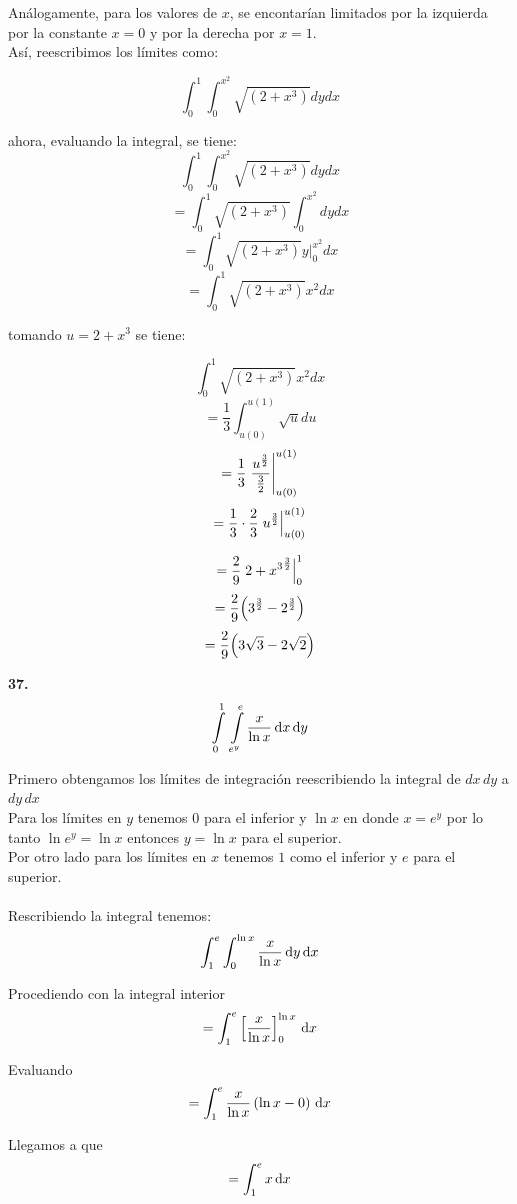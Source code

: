 \documentclass[11pt]{report}
\begin{document}
Análogamente, para los valores de $x$, se encontarían limitados por la izquierda
por la constante $x = 0$ y por la derecha por $x = 1$. \\

Así, reescribimos los límites como:

	$$ \int_{0}^{1}\int_{0}^{x^2} \sqrt{(2 + x^3)} dy dx  $$

ahora, evaluando la integral, se tiene:
	$$   \int_{0}^{1}\int_{0}^{x^2} \sqrt{(2 + x^3)} dy dx  $$
	$$ = \int_{0}^{1}\sqrt{(2 + x^3)} \int_{0}^{x^2} dy dx  $$
	$$ = \int_{0}^{1}\sqrt{(2 + x^3)} y \Big|_{0}^{x^2} dx  $$
	$$ = \int_{0}^{1}\sqrt{(2 + x^3)} x^2  dx  $$

tomando $u = 2 + x^3$ se tiene:

	$$   \int_{0}^{1}\sqrt{(2 + x^3)} x^2  dx  $$
	$$ = \frac{1}{3} \int_{u(0)}^{u(1)}\sqrt{u} du  $$
	$$ = \frac{1}{3} \left.\frac{u^{\frac{3}{2}}}{\frac{3}{2}}\right\rvert_{u(0)}^{u(1)}  $$
	$$ = \frac{1}{3} \cdot \frac{2}{3} \left.u^{\frac{3}{2}}\right\rvert_{u(0)}^{u(1)}  $$

	$$ = \frac{2}{9} \left. {2 + x^3}^{\frac{3}{2}} \right\rvert_{0}^{1}  $$
	$$ = \frac{2}{9} \Big( {3}^{\frac{3}{2}} -
						  {2}^{\frac{3}{2}} \Big)  $$
	$$ = \frac{2}{9} \Big( 3 \sqrt{3} - 2 \sqrt{2}  \Big)  $$

\textbf{37.} \\

\[ \int \limits_0^1 \, \int \limits_{e^y}^e \frac{x}{\ln{x}} \, \text dx \, \text dy \]

Primero obtengamos los límites de integración reescribiendo la integral de $dx\,dy$ a $dy\,dx$ \\

Para los límites en $y$ tenemos $0$ para el inferior y $\ln{x}$ en donde $x = e^y$ por lo tanto $\ln{e^y} = \ln{x} $ entonces $y = \ln{x}$ para el superior. \\
Por otro lado para los límites en $x$ tenemos $1$ como el inferior y $e$ para el superior. \\ \\

Rescribiendo la integral tenemos:
$$\int_{1}^{e} \int_{0}^{\ln{x}} \frac{x}{\ln{x}} \, \text dy \, \text dx$$

Procediendo con la integral interior
$$ = \int_{1}^{e} \left[ \frac{x}{\ln{x}} \right]_{0}^{\ln{x}} \, \text dx$$

Evaluando
$$ = \int_{1}^{e} \frac{x}{\ln{x}} \left(\ln{x} - 0\right) \, \text dx$$

Llegamos a que
$$ = \int_{1}^{e} x \, \text dx$$
\end{document}
